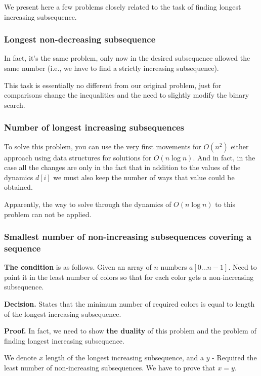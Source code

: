 We present here a few problems closely related to the task of finding longest increasing subsequence.

\subsubsection{ Longest non-decreasing subsequence }

In fact, it's the same problem, only now in the desired subsequence allowed the same number (i.e., we have to find a strictly increasing subsequence).

This task is essentially no different from our original problem, just for comparisons change the inequalities and the need to slightly modify the binary search.

\subsubsection{ Number of longest increasing subsequences }

To solve this problem, you can use the very first movements for $O (n ^ 2)$ either approach using data structures for solutions for $O (n \log n)$. And in fact, in the case all the changes are only in the fact that in addition to the values ​​of the dynamics $d [i]$ we must also keep the number of ways that value could be obtained.

Apparently, the way to solve through the dynamics of $O (n \log n)$ to this problem can not be applied.

\subsubsection{ Smallest number of non-increasing subsequences covering a sequence }

\textbf{The condition} is as follows. Given an array of $n$ numbers $a [0 \ldots n-1]$. Need to paint it in the least number of colors so that for each color gets a non-increasing subsequence.

\textbf{Decision.} States that the minimum number of required colors is equal to length of the longest increasing subsequence.

\textbf{Proof.} In fact, we need to show \textbf{the duality} of this problem and the problem of finding longest increasing subsequence.

We denote $x$ length of the longest increasing subsequence, and a $y$ - Required the least number of non-increasing subsequences. We have to prove that $x = y$.

